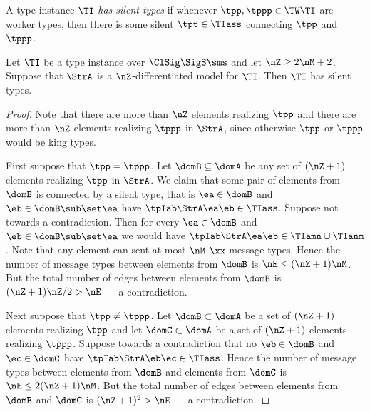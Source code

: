 \begin{definition}
A type instance $\TI$ \emph{has silent types} if whenever $\tpp,\tppp\in\TW\TI$
are worker types, then there is some silent $\tpt\in\TIass$ connecting $\tpp$
and $\tppp$.
\end{definition}
\begin{remark}\label{rem:silent}
Let $\TI$ be a type instance over $\ClSig\SigS\sms$ and let $\nZ\geq2\nM+2$.
Suppose that $\StrA$ is a $\nZ$-differentiated model for $\TI$.
Then $\TI$ has silent types.
\end{remark}
\begin{proof}
Note that there are more than $\nZ$ elements realizing $\tpp$ and there are
more than $\nZ$ elements realizing $\tppp$ in $\StrA$, since otherwise $\tpp$ or
$\tppp$ would be king types.

First suppose that $\tpp=\tppp$.
Let $\domB\subseteq\domA$ be any set of $(\nZ+1)$ elements realizing $\tpp$ in
$\StrA$.
We claim that some pair of elements from $\domB$ is connected by a silent type,
that is $\ea\in\domB$ and $\eb\in\domB\sub\set\ea$ have
$\tpIab\StrA\ea\eb\in\TIass$.
Suppose not towards a contradiction.
Then for every $\ea\in\domB$ and $\eb\in\domB\sub\set\ea$ we would have
$\tpIab\StrA\ea\eb\in\TIamn\cup\TIanm$.
Note that any element can sent at most $\nM$ $\xx$-message types.
Hence the number of message types between elements from $\domB$ is
$\nE\leq(\nZ+1)\nM$.
But the total number of edges between elements from $\domB$ is $(\nZ+1)\nZ/2 >
\nE$ --- a contradiction.

Next suppose that $\tpp\neq\tppp$.
Let $\domB\subset\domA$ be a set of $(\nZ+1)$ elements realizing $\tpp$ and let
$\domC\subset\domA$ be a set of $(\nZ+1)$ elements realizing $\tppp$.
Suppose towards a contradiction that no $\eb\in\domB$ and $\ec\in\domC$ have
$\tpIab\StrA\eb\ec\in\TIass$.
Hence the number of message types between elements from $\domB$ and elements
from $\domC$ is $\nE\leq2(\nZ+1)\nM$.
But the total number of edges between elements from $\domB$ and $\domC$ is
$(\nZ+1)^2 > \nE$ --- a contradiction.
\end{proof}

